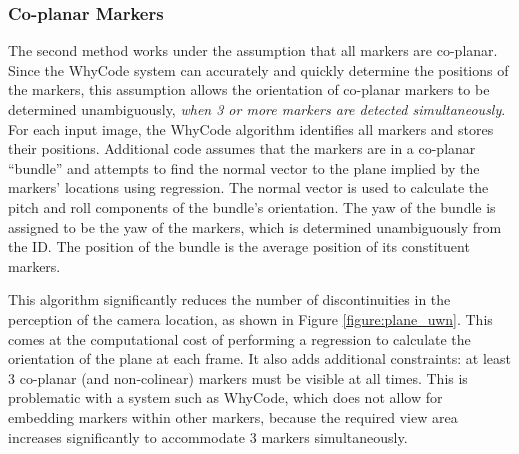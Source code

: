\subsubsection{Co-planar Markers}

The second method works under the assumption that all markers are co-planar.
Since the WhyCode system can accurately and quickly determine the positions of the markers,
this assumption allows the orientation of co-planar markers to be determined unambiguously,
\textit{when 3 or more markers are detected simultaneously}.
For each input image, the WhyCode algorithm identifies all markers and stores their positions.
Additional code assumes that the markers are in a co-planar ``bundle'' and attempts to find the normal vector to the
plane implied by the markers' locations using regression.
The normal vector is used to calculate the pitch and roll components of the bundle's orientation.
The yaw of the bundle is assigned to be the yaw of the markers, which is determined unambiguously from the ID.
The position of the bundle is the average position of its constituent markers.

This algorithm significantly reduces the number of discontinuities in the perception of the camera location,
as shown in Figure \ref{figure:plane_uwn}.
This comes at the computational cost of performing a regression to calculate the orientation of the plane at each frame.
It also adds additional constraints: at least 3 co-planar (and non-colinear) markers must be visible at all times.
This is problematic with a system such as WhyCode, which does not allow for embedding markers within other markers,
because the required view area increases significantly to accommodate 3 markers simultaneously.

